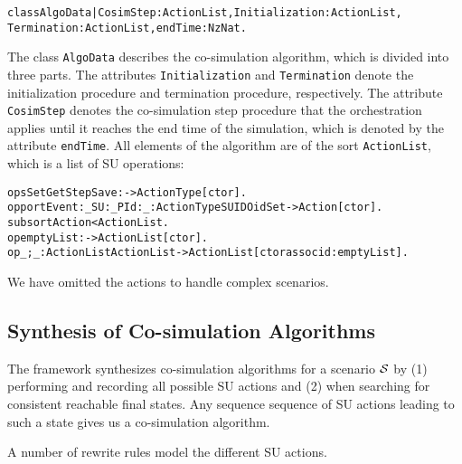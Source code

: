 \small
\begin{alltt}
class AlgoData | CosimStep : ActionList,   Initialization : ActionList, 
                 Termination : ActionList, endTime : NzNat .
\end{alltt}
\normalsize

The class \texttt{AlgoData} describes the co-simulation algorithm, which is divided into three parts.
The attributes \texttt{Initialization} and \texttt{Termination} denote the initialization procedure and termination procedure, respectively.
The attribute \texttt{CosimStep} denotes the co-simulation step procedure that the orchestration applies until it reaches the end time of the simulation, which is denoted by the attribute \texttt{endTime}.
All elements of the algorithm are of the sort \texttt{ActionList}, which is a list of SU operations:

\small
\begin{alltt}
ops Set Get Step Save : -> ActionType [ctor] . 
op portEvent:_SU:_PId:_ : ActionType SUID OidSet -> Action [ctor] .
subsort Action < ActionList .
op emptyList : -> ActionList [ctor] .
op _;_ : ActionList ActionList -> ActionList [ctor assoc id: emptyList] .
\end{alltt}
\normalsize

We have omitted the actions to handle complex scenarios.


\subsection{Synthesis of Co-simulation Algorithms}
The framework synthesizes co-simulation algorithms for a scenario $\mathcal{S}$ by (1) performing and recording all possible SU actions and (2) when searching for consistent reachable final states.
Any sequence sequence of SU actions leading to such a state gives us a co-simulation algorithm.

A number of rewrite rules model the different SU actions.

